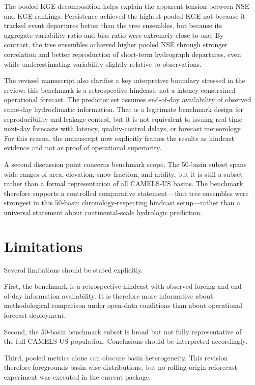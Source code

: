 \documentclass[preprint,12pt,authoryear]{elsarticle}
\begin{document}
The pooled KGE decomposition helps explain the apparent tension between NSE and KGE rankings. Persistence achieved the highest pooled KGE not because it tracked event departures better than the tree ensembles, but because its aggregate variability ratio and bias ratio were extremely close to one. By contrast, the tree ensembles achieved higher pooled NSE through stronger correlation and better reproduction of short-term hydrograph departures, even while underestimating variability slightly relative to observations.

The revised manuscript also clarifies a key interpretive boundary stressed in the review: this benchmark is a retrospective hindcast, not a latency-constrained operational forecast. The predictor set assumes end-of-day availability of observed same-day hydroclimatic information. That is a legitimate benchmark design for reproducibility and leakage control, but it is not equivalent to issuing real-time next-day forecasts with latency, quality-control delays, or forecast meteorology. For this reason, the manuscript now explicitly frames the results as hindcast evidence and not as proof of operational superiority.

A second discussion point concerns benchmark scope. The 50-basin subset spans wide ranges of area, elevation, snow fraction, and aridity, but it is still a subset rather than a formal representation of all CAMELS-US basins. The benchmark therefore supports a controlled comparative statement---that tree ensembles were strongest in this 50-basin chronology-respecting hindcast setup---rather than a universal statement about continental-scale hydrologic prediction.

\section{Limitations}

Several limitations should be stated explicitly.

First, the benchmark is a retrospective hindcast with observed forcing and end-of-day information availability. It is therefore more informative about methodological comparison under open-data conditions than about operational forecast deployment.

Second, the 50-basin benchmark subset is broad but not fully representative of the full CAMELS-US population. Conclusions should be interpreted accordingly.

Third, pooled metrics alone can obscure basin heterogeneity. This revision therefore foregrounds basin-wise distributions, but no rolling-origin reforecast experiment was executed in the current package.
\end{document}
